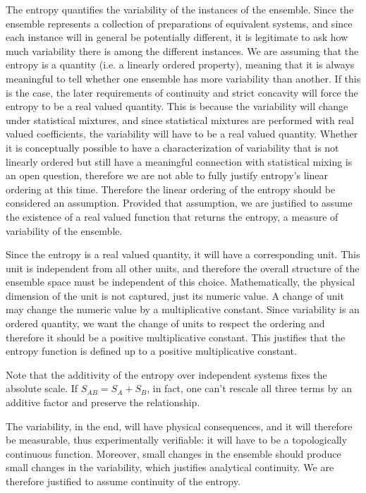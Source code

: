 \begin{mathSection}
\begin{justification}
	The entropy quantifies the variability of the instances of the ensemble. Since the ensemble represents a collection of preparations of equivalent systems, and since each instance will in general be potentially different, it is legitimate to ask how much variability there is among the different instances. We are assuming that the entropy is a quantity (i.e. a linearly ordered property), meaning that it is always meaningful to tell whether one ensemble has more variability than another. If this is the case, the later requirements of continuity and strict concavity will force the entropy to be a real valued quantity. This is because the variability will change under statistical mixtures, and since statistical mixtures are performed with real valued coefficients, the variability will have to be a real valued quantity. Whether it is conceptually possible to have a characterization of variability that is not linearly ordered but still have a meaningful connection with statistical mixing is an open question, therefore we are not able to fully justify entropy's linear ordering at this time. Therefore the linear ordering of the entropy should be considered an assumption. Provided that assumption, we are justified to assume the existence of a real valued function that returns the entropy, a measure of variability of the ensemble.
	
	Since the entropy is a real valued quantity, it will have a corresponding unit. This unit is independent from all other units, and therefore the overall structure of the ensemble space must be independent of this choice. Mathematically, the physical dimension of the unit is not captured, just its numeric value. A change of unit may change the numeric value by a multiplicative constant. Since variability is an ordered quantity, we want the change of units to respect the ordering and therefore it should be a positive multiplicative constant. This justifies that the entropy function is defined up to a positive multiplicative constant.
	
	Note that the additivity of the entropy over independent systems fixes the absolute scale. If $S_{AB} = S_A + S_B$, in fact, one can't rescale all three terms by an additive factor and preserve the relationship.
	
	The variability, in the end, will have physical consequences, and it will therefore be measurable, thus experimentally verifiable: it will have to be a topologically continuous function. Moreover, small changes in the ensemble should produce small changes in the variability, which justifies analytical continuity. We are therefore justified to assume continuity of the entropy.
	

\end{justification}
\end{mathSection}
